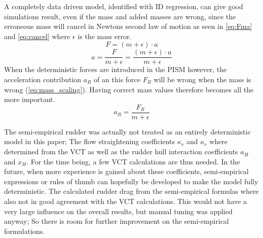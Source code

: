A completely data driven model, identified with ID regression, can give good simulations result, even if the mass and added masses are wrong, since the erroneous mass will cancel in Newtons second law of motion as seen in \autoref{eq:Fma} and \autoref{eq:cancel} where $\epsilon$ is the mass error.
\begin{equation}
    \label{eq:Fma}
    F = (m+\epsilon) \cdot a
\end{equation}
\begin{equation}
    \label{eq:cancel}
    a = \frac{F}{m+\epsilon} = \frac{(m+\epsilon) \cdot a}{m+\epsilon}
\end{equation}
When the deterministic forces are introduced in the PISM however, the acceleration contribution $a_R$ of an this force $F_R$ will be wrong when the mass is wrong (\autoref{eq:mass_scaling}). Having correct mass values therefore becomes all the more important.
\begin{equation}
    \label{eq:mass_scaling}
    a_R = \frac{F_R}{m+\epsilon}
\end{equation}

The semi-empirical rudder was actually not treated as an entirely deterministic model in this paper; The flow straightening coefficients $\kappa_v$ and $\kappa_r$ where determined from the VCT as well as the rudder hull interaction coefficients $a_H$ and $x_H$. For the time being, a few VCT calculations are thus needed. In the future, when more experience is gained about these coefficients, semi-empirical expressions or rules of thumb can hopefully be developed to make the model fully deterministic.
The calculated rudder drag from the semi-empirical formulas where also not in good agreement with the VCT calculations.
This would not have a very large influence on the overall results, but manual tuning was applied anyway; So there is room for further improvement on the semi-empirical formulations. 

